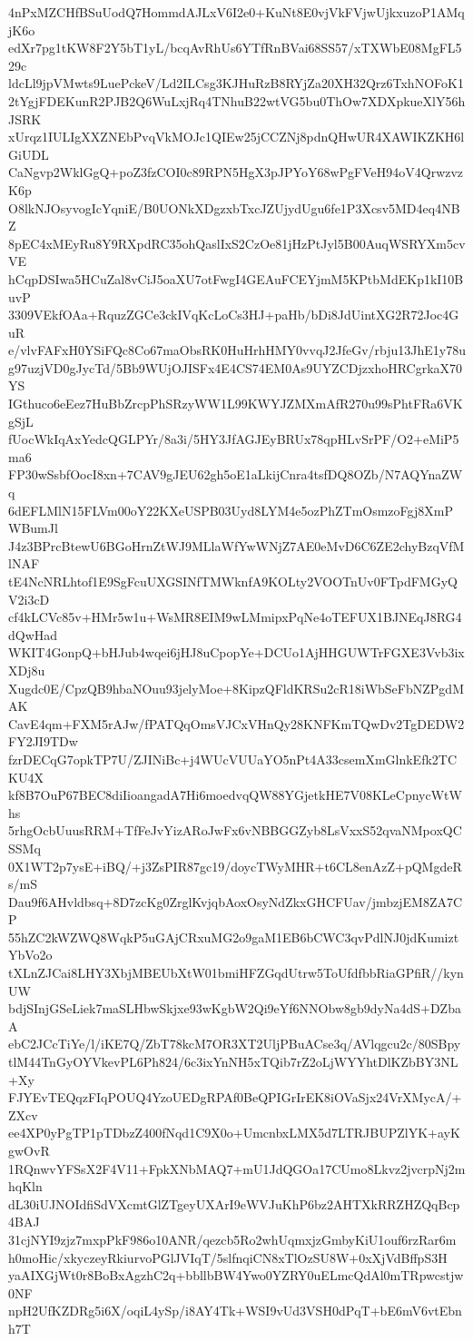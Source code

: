 4nPxMZCHfBSuUodQ7HommdAJLxV6I2e0+KuNt8E0vjVkFVjwUjkxuzoP1AMqjK6o
edXr7pg1tKW8F2Y5bT1yL/bcqAvRhUs6YTfRnBVai68SS57/xTXWbE08MgFL529c
ldcLl9jpVMwts9LuePckeV/Ld2ILCsg3KJHuRzB8RYjZa20XH32Qrz6TxhNOFoK1
2tYgjFDEKunR2PJB2Q6WuLxjRq4TNhuB22wtVG5bu0ThOw7XDXpkueXlY56hJSRK
xUrqz1IULIgXXZNEbPvqVkMOJc1QIEw25jCCZNj8pdnQHwUR4XAWIKZKH6lGiUDL
CaNgvp2WklGgQ+poZ3fzCOI0c89RPN5HgX3pJPYoY68wPgFVeH94oV4QrwzvzK6p
O8lkNJOsyvogIcYqniE/B0UONkXDgzxbTxcJZUjydUgu6fe1P3Xcsv5MD4eq4NBZ
8pEC4xMEyRu8Y9RXpdRC35ohQaslIxS2CzOe81jHzPtJyl5B00AuqWSRYXm5cvVE
hCqpDSIwa5HCuZal8vCiJ5oaXU7otFwgI4GEAuFCEYjmM5KPtbMdEKp1kI10BuvP
3309VEkfOAa+RquzZGCe3ckIVqKcLoCs3HJ+paHb/bDi8JdUintXG2R72Joc4GuR
e/vlvFAFxH0YSiFQc8Co67maObsRK0HuHrhHMY0vvqJ2JfeGv/rbju13JhE1y78u
g97uzjVD0gJycTd/5Bb9WUjOJISFx4E4CS74EM0As9UYZCDjzxhoHRCgrkaX70YS
IGthuco6eEez7HuBbZrcpPhSRzyWW1L99KWYJZMXmAfR270u99sPhtFRa6VKgSjL
fUocWkIqAxYedcQGLPYr/8a3i/5HY3JfAGJEyBRUx78qpHLvSrPF/O2+eMiP5ma6
FP30wSsbfOocI8xn+7CAV9gJEU62gh5oE1aLkijCnra4tsfDQ8OZb/N7AQYnaZWq
6dEFLMlN15FLVm00oY22KXeUSPB03Uyd8LYM4e5ozPhZTmOsmzoFgj8XmPWBumJl
J4z3BPrcBtewU6BGoHrnZtWJ9MLlaWfYwWNjZ7AE0eMvD6C6ZE2chyBzqVfMlNAF
tE4NcNRLhtof1E9SgFcuUXGSINfTMWknfA9KOLty2VOOTnUv0FTpdFMGyQV2i3cD
cf4kLCVc85v+HMr5w1u+WsMR8EIM9wLMmipxPqNe4oTEFUX1BJNEqJ8RG4dQwHad
WKIT4GonpQ+bHJub4wqei6jHJ8uCpopYe+DCUo1AjHHGUWTrFGXE3Vvb3ixXDj8u
Xugdc0E/CpzQB9hbaNOuu93jelyMoe+8KipzQFldKRSu2cR18iWbSeFbNZPgdMAK
CavE4qm+FXM5rAJw/fPATQqOmsVJCxVHnQy28KNFKmTQwDv2TgDEDW2FY2JI9TDw
fzrDECqG7opkTP7U/ZJINiBc+j4WUcVUUaYO5nPt4A33csemXmGlnkEfk2TCKU4X
kf8B7OuP67BEC8diIioangadA7Hi6moedvqQW88YGjetkHE7V08KLeCpnycWtWhs
5rhgOcbUuusRRM+TfFeJvYizARoJwFx6vNBBGGZyb8LsVxxS52qvaNMpoxQCSSMq
0X1WT2p7ysE+iBQ/+j3ZsPIR87gc19/doycTWyMHR+t6CL8enAzZ+pQMgdeRs/mS
Dau9f6AHvldbsq+8D7zcKg0ZrglKvjqbAoxOsyNdZkxGHCFUav/jmbzjEM8ZA7CP
55hZC2kWZWQ8WqkP5uGAjCRxuMG2o9gaM1EB6bCWC3qvPdlNJ0jdKumiztYbVo2o
tXLnZJCai8LHY3XbjMBEUbXtW01bmiHFZGqdUtrw5ToUfdfbbRiaGPfiR//kynUW
bdjSInjGSeLiek7maSLHbwSkjxe93wKgbW2Qi9eYf6NNObw8gb9dyNa4dS+DZbaA
ebC2JCcTiYe/l/iKE7Q/ZbT78kcM7OR3XT2UljPBuACse3q/AVlqgcu2c/80SBpy
tlM44TnGyOYVkevPL6Ph824/6c3ixYnNH5xTQib7rZ2oLjWYYhtDlKZbBY3NL+Xy
FJYEvTEQqzFIqPOUQ4YzoUEDgRPAf0BeQPIGrIrEK8iOVaSjx24VrXMycA/+ZXcv
ee4XP0yPgTP1pTDbzZ400fNqd1C9X0o+UmcnbxLMX5d7LTRJBUPZlYK+ayKgwOvR
1RQnwvYFSsX2F4V11+FpkXNbMAQ7+mU1JdQGOa17CUmo8Lkvz2jvcrpNj2mhqKln
dL30iUJNOIdfiSdVXcmtGlZTgeyUXArI9eWVJuKhP6bz2AHTXkRRZHZQqBcp4BAJ
31cjNYI9zjz7mxpPkF986o10ANR/qezcb5Ro2whUqmxjzGmbyKiU1ouf6rzRar6m
h0moHic/xkyczeyRkiurvoPGlJVIqT/5slfnqiCN8xTlOzSU8W+0xXjVdBffpS3H
yaAIXGjWt0r8BoBxAgzhC2q+bbllbBW4Ywo0YZRY0uELmcQdAl0mTRpwcstjw0NF
npH2UfKZDRg5i6X/oqiL4ySp/i8AY4Tk+WSI9vUd3VSH0dPqT+bE6mV6vtEbnh7T
